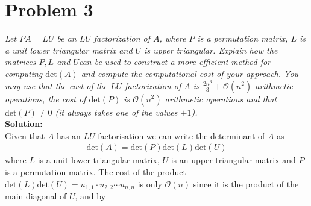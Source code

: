 \documentclass[12pt,
               a4paper,
               article,
               oneside,
               norsk,oldfontcommands]{memoir}
\newcommand{\spaze}{\vspace{4mm}\\}
\begin{document}
\section*{\centering Problem 3}
\emph{Let $PA = LU$ be an $LU$ factorization of $A$, where $P$ is a permutation matrix, $L$ is a unit lower triangular matrix and $U$ is upper triangular. Explain how the matrices $P, L$ and $U $can be used to construct a more efficient method for computing $\text{det}(A)$ and compute the computational cost of your approach. You may use that the cost of the $LU$ factorization of $A$ is $\frac{2n^3}{3} + \mathcal{O}(n^2)$ arithmetic operations, the cost of $\text{det}(P )$ is $\mathcal{O}(n^2)$ arithmetic operations and that $\text{det}(P)  \neq 0$ (it always takes one of the values $\pm 1$).} \spaze 
\textbf{Solution:} \spaze 
Given that $A$ has an $LU$ factorisation we can write the determinant of $A$ as 
\begin{align*}
\text{det}(A) = \text{det}(P)\text{det}(L) \text{det}(U)  
\end{align*}
where $L$ is a unit lower triangular matrix, $U$ is an upper triangular matrix and $P$ is a permutation matrix. The cost of the product $\text{det}(L) \text{det}(U) = u_{1,1} \cdot u_{2,2} \cdots u_{n,n}$ is only $\mathcal{O}(n)$ since it is the product of the main diagonal of $U$, and by 
\end{document}
